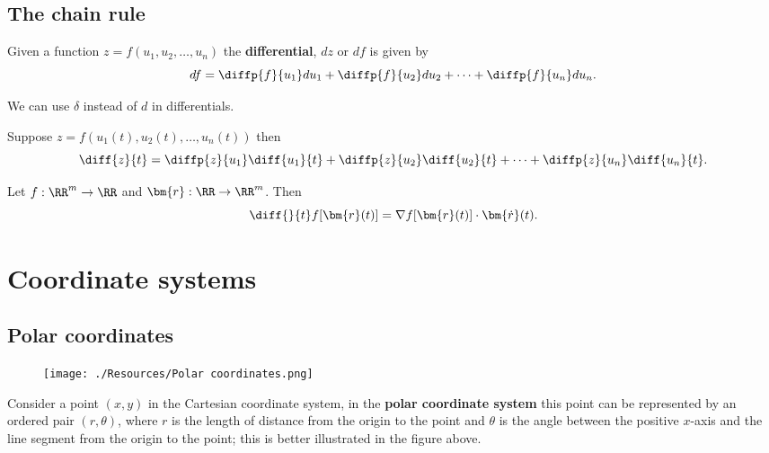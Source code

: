 \documentclass[12pt, a4paper]{article}
\begin{document}
\subsection{The chain rule}

\begin{definition}
    Given a function \(z=f(u_1,u_2,\ldots , u_n)\) the \textbf{differential}, \(dz\) or \(df\) is given by 
    \[df = \diffp{f}{{u_1}} du_1+\diffp{f}{{u_2}} du_2 + \cdots + \diffp{f}{{u_n}} du_n.\]
\end{definition}

\begin{mdnote}
    We can use \(\delta\) instead of \(d\) in differentials.
\end{mdnote}

\begin{mdthm}
    Suppose \(z = f(u_1(t), u_2(t), \ldots, u_n(t))\) then
    \[\diff{z}{t} = \diffp{z}{{u_1}} \diff{{u_1}}{t} + \diffp{z}{{u_2}} \diff{{u_2}}{t} +\cdots + \diffp{z}{{u_n}} \diff{{u_n}}{t}.\]
\end{mdthm}

\begin{mdthm}[Paths]
    Let \(f : \RR^m \to \RR\) and \(\bm{r}: \RR \to \RR^m\). Then 
    \[\diff{}{t} f[\bm{r}(t)] = \nabla f[\bm{r}(t)] \cdot \bm{\dot{r}}(t).\]
\end{mdthm}

\section{Coordinate systems}

\subsection{Polar coordinates}

\begin{figure}[H]
     \begin{center}
         \texttt{[image: ./Resources/Polar coordinates.png]}
     \end{center}
\end{figure}

Consider a point \((x,y)\) in the Cartesian coordinate system, in the \textbf{polar coordinate system} this point can be represented by an ordered pair \((r,\theta)\), where \(r\) is the length of distance from the origin to the point and \(\theta\) is the angle between the positive \(x\)-axis and the line segment from the origin to the point; this is better illustrated in the figure above.
\end{document}
